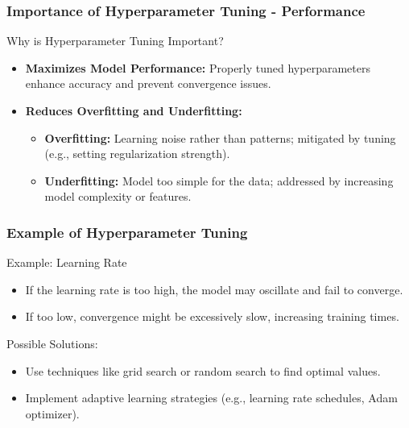 \documentclass[aspectratio=169]{beamer}
\begin{document}
\begin{frame}[fragile]
    \frametitle{Importance of Hyperparameter Tuning - Performance}
    \begin{block}{Why is Hyperparameter Tuning Important?}
        \begin{itemize}
            \item \textbf{Maximizes Model Performance:} Properly tuned hyperparameters enhance accuracy and prevent convergence issues.
            \item \textbf{Reduces Overfitting and Underfitting:}
            \begin{itemize}
                \item \textbf{Overfitting:} Learning noise rather than patterns; mitigated by tuning (e.g., setting regularization strength).
                \item \textbf{Underfitting:} Model too simple for the data; addressed by increasing model complexity or features.
            \end{itemize}
        \end{itemize}
    \end{block}
\end{frame}

\begin{frame}[fragile]
    \frametitle{Example of Hyperparameter Tuning}
    \begin{block}{Example: Learning Rate}
        \begin{itemize}
            \item If the learning rate is too high, the model may oscillate and fail to converge.
            \item If too low, convergence might be excessively slow, increasing training times.
        \end{itemize}
    \end{block}
    \begin{block}{Possible Solutions:}
        \begin{itemize}
            \item Use techniques like grid search or random search to find optimal values.
            \item Implement adaptive learning strategies (e.g., learning rate schedules, Adam optimizer).
        \end{itemize}
    \end{block}
\end{frame}
\end{document}

